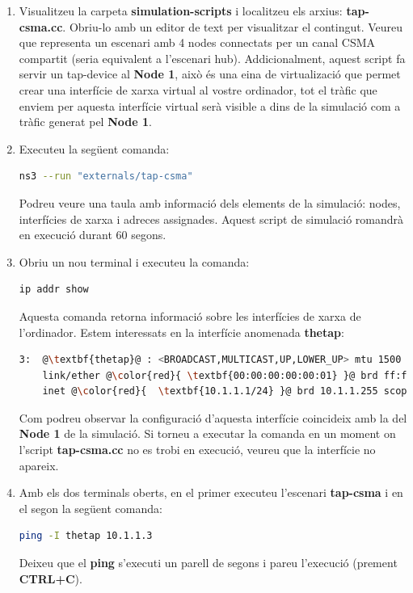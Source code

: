 \documentclass[12pt,a4paper]{article}
\begin{document}
\begin{enumerate}
\item Visualitzeu la carpeta \textbf{simulation-scripts} i localitzeu els arxius: \textbf{tap-csma.cc}. Obriu-lo amb un editor de text per visualitzar el contingut.
Veureu que representa un escenari amb 4 nodes connectats per un canal CSMA compartit (seria equivalent a l'escenari hub).
\newline
Addicionalment, aquest script fa servir un tap-device al \textbf{Node 1}, això és una eina de virtualizació
que permet crear una interfície de xarxa virtual al vostre ordinador, tot el tràfic que enviem per aquesta interfície virtual
serà visible a dins de la simulació com a tràfic generat pel \textbf{Node 1}.

\item Executeu la següent comanda: 
\begin{lstlisting}[language=bash]
ns3 --run "externals/tap-csma" 
\end{lstlisting}
Podreu veure una taula amb informació dels elements de la simulació: nodes, interfícies de xarxa i adreces assignades. Aquest script de simulació romandrà en execució durant 60 segons.
\item Obriu un nou terminal i executeu la comanda:
\begin{lstlisting}[language=bash]
ip addr show
\end{lstlisting}
Aquesta comanda retorna informació sobre les interfícies de xarxa de l'ordinador. Estem interessats en la interfície anomenada \textbf{thetap}:

\begin{lstlisting}[escapechar=@,language=bash,basicstyle=\footnotesize]
3:  @\textbf{thetap}@ : <BROADCAST,MULTICAST,UP,LOWER_UP> mtu 1500 qdisc fq_codel 
    link/ether @\color{red}{ \textbf{00:00:00:00:00:01} }@ brd ff:ff:ff:ff:ff:ff
    inet @\color{red}{  \textbf{10.1.1.1/24} }@ brd 10.1.1.255 scope global thetap
\end{lstlisting}

Com podreu observar la configuració d'aquesta interfície coincideix amb la del \textbf{Node 1} de la simulació.
Si torneu a executar la comanda en un moment on l'script \textbf{tap-csma.cc} no es trobi en execució,
veureu que la interfície no apareix.

\item Amb els dos terminals oberts, en el primer executeu l'escenari  \textbf{tap-csma} i en el segon la següent comanda:
\begin{lstlisting}[language=bash]
ping -I thetap 10.1.1.3
\end{lstlisting}
Deixeu que el \textbf{ping} s'executi un parell de segons i pareu l'execució (prement \textbf{CTRL+C}).


\end{enumerate}
\end{document}
